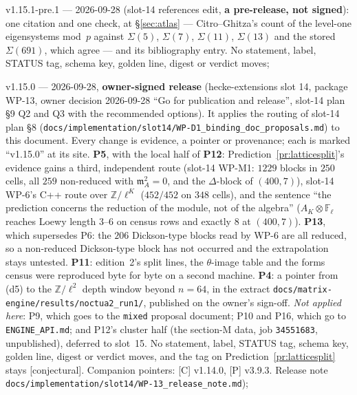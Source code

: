 \documentclass[11pt]{article}
\theoremstyle{remark}
\newcommand{\F}{\mathbb{F}}
\newcommand{\Z}{\mathbb{Z}}
\newcommand{\Fl}{\F_\ell}
\newcommand{\m}{\mathfrak{m}}
\newcommand{\CONJ}{\textsf{[conjectural]}}
\begin{document}
v1.15.1-pre.1 --- 2026-09-28 (slot-14 references edit, \textbf{a pre-release, not signed}): one citation and
one check, at \S\ref{sec:atlas} --- Citro--Ghitza's count of the level-one eigensystems mod~$p$ against $\Sigma(5)$,
$\Sigma(7)$, $\Sigma(11)$, $\Sigma(13)$ and the stored $\Sigma(691)$, which agree --- and its bibliography entry. No statement,
label, STATUS tag, schema key, golden line, digest or verdict moves;

v1.15.0 --- 2026-09-28, \textbf{owner-signed release} (hecke-extensions slot 14, package WP-13, owner decision
2026-09-28 ``Go for publication and release'', slot-14 plan \S9 Q2 and Q3 with the recommended options). It applies the routing of
slot-14 plan \S8 (\texttt{docs/implementation/slot14/WP-D1\_binding\_doc\_proposals.md}) to this document. Every change is evidence, a
pointer or provenance; each is marked ``v1.15.0'' at its site. \textbf{P5}, with the local half of \textbf{P12}: Prediction~\ref{pr:latticesplit}'s
evidence gains a third, independent route (slot-14 WP-M1: $1229$ blocks in $250$ cells, all $259$ non-reduced with $\m_A^2=0$, and
the $\Delta$-block of $(400,7)$), slot-14 WP-6's C++ route over $\Z/\ell^{K}$ ($452/452$ on $348$ cells), and the sentence ``the prediction
concerns the reduction of the module, not of the algebra'' ($A_K\otimes\Fl$ reaches Loewy length $3$--$6$ on census rows and exactly
$8$ at $(400,7)$). \textbf{P13}, which supersedes P6: the $206$ Dickson-type blocks read by WP-6 are all reduced, so a non-reduced
Dickson-type block has not occurred and the extrapolation stays untested. \textbf{P11}: edition~2's split lines, the $\theta$-image
table and the forms census were reproduced byte for byte on a second machine. \textbf{P4}: a pointer from (d5) to the $\Z/\ell^2$
depth window beyond $n=64$, in the extract \texttt{docs/matrix-engine/results/noctua2\_run1/}, published on the owner's sign-off.
\emph{Not applied here}: P9, which goes to the \texttt{mixed} proposal document; P10 and P16, which go to \texttt{ENGINE\_API.md}; and
P12's cluster half (the section-M data, job \texttt{34551683}, unpublished), deferred to slot~15. No statement, label, STATUS tag,
schema key, golden line, digest or verdict moves, and the tag on Prediction~\ref{pr:latticesplit} stays \CONJ. Companion pointers:
[C] v1.14.0, [P] v3.9.3. Release note \texttt{docs/implementation/slot14/WP-13\_release\_note.md});
\end{document}
